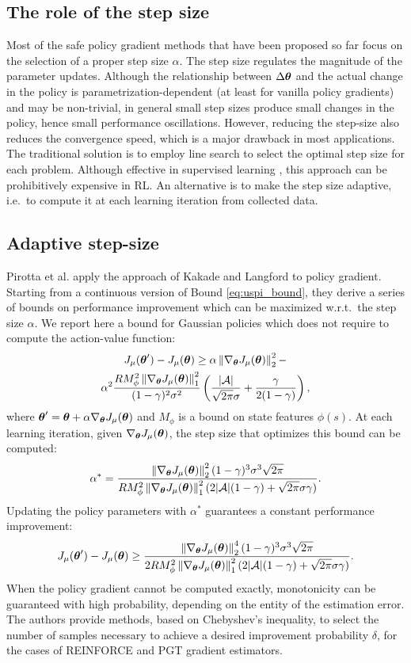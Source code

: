 \subsection{The role of the step size}
Most of the safe policy gradient methods that have been proposed so far focus on the selection of a proper step size $\alpha$.
The step size regulates the magnitude of the parameter updates. Although the relationship between $\Delta\vtheta$ and the actual change in the policy is parametrization-dependent (at least for vanilla policy gradients) and may be non-trivial, in general small step sizes produce small changes in the policy, hence small performance oscillations. However, reducing the step-size also reduces the convergence speed, which is a major drawback in most applications. 
The traditional solution is to employ line search to select the optimal step size for each problem. Although effective in supervised learning \cite{More:1994:LSA:192115.192132}, this approach can be prohibitively expensive in \ac{RL}. 
An alternative is to make the step size adaptive, i.e.\ to compute it at each learning iteration from collected data.

\subsection{Adaptive step-size}\label{sec:adaptive_ss}
Pirotta et al. \cite{NIPS2013_5186} apply the approach of Kakade and Langford \cite{kakade2002approximately} to policy gradient. Starting from a continuous version of Bound \ref{eq:uspi_bound}, they derive a series of bounds on performance improvement which can be maximized w.r.t.\ the step size $\alpha$. We report here a bound for Gaussian policies which does not require to compute the action-value function:
\begin{multline}\label{eq:pirotta_bound2}
J_{\mu}(\vtheta')-J_{\mu}(\vtheta) \geq \alpha\norm[2]{\gradJ{\vtheta}}^2 - \\
	\alpha^2\frac{RM_\phi^2\norm[1]{\gradJ{\vtheta}}^2}{(1-\gamma)^2\sigma^2}
	\left(\frac{|\mathcal{A}|}{\sqrt{2\pi}\sigma} + \frac{\gamma}{2(1-\gamma)}\right),
\end{multline}
where $\vtheta' = \vtheta+\alpha\gradJ{\vtheta}$ and $M_\phi$ is a bound on state features $\phi(s)$.
At each learning iteration, given $\gradJ{\vtheta}$, the step size that optimizes this bound can be computed:
\[
\alpha^* = \frac{\norm[2]{\gradJ{\vtheta}}^2(1-\gamma)^3\sigma^3\sqrt{2\pi}}
	{RM_\phi^2\norm[1]{\gradJ{\vtheta}}^2(2|\mathcal{A}|(1-\gamma)+\sqrt{2\pi}\sigma\gamma)}.
\] 
Updating the policy parameters with $\alpha^*$ guarantees a constant performance improvement:
\[
J_{\mu}(\vtheta')-J_{\mu}(\vtheta) \geq
	\frac{\norm[2]{\gradJ{\vtheta}}^4(1-\gamma)^3\sigma^3\sqrt{2\pi}}
	{2RM_\phi^2\norm[1]{\gradJ{\vtheta}}^2(2|\mathcal{A}|(1-\gamma)+\sqrt{2\pi}\sigma\gamma)}.
\]
When the policy gradient cannot be computed exactly, monotonicity can be guaranteed with high probability, depending on the entity of the estimation error. The authors provide methods, based on Chebyshev's inequality, to select the number of samples necessary to achieve a desired improvement probability $\delta$, for the cases of REINFORCE and PGT gradient estimators.
